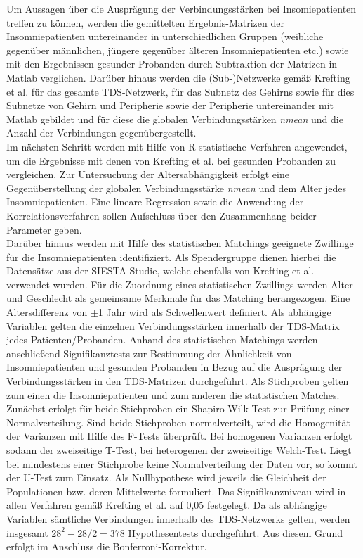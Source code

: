 Um Aussagen über die Ausprägung der Verbindungsstärken bei Insomiepatienten treffen zu können, werden die gemittelten Ergebnis-Matrizen der Insomniepatienten untereinander in unterschiedlichen Gruppen (weibliche gegenüber männlichen, jüngere gegenüber älteren Insomniepatienten etc.) sowie mit den Ergebnissen gesunder Probanden durch Subtraktion der Matrizen in Matlab verglichen. Darüber hinaus werden die (Sub-)Netzwerke gemäß Krefting et al. für das gesamte \acs{TDS}-Netzwerk, für das Subnetz des Gehirns sowie für dies Subnetze von Gehirn und Peripherie sowie der Peripherie untereinander mit Matlab gebildet und für diese die globalen Verbindungsstärken \textit{nmean} und die Anzahl der Verbindungen gegenübergestellt.\\

Im nächsten Schritt werden mit Hilfe von R statistische Verfahren angewendet, um die Ergebnisse mit denen von Krefting et al. bei gesunden Probanden zu vergleichen. Zur Untersuchung der Altersabhängigkeit erfolgt eine Gegenüberstellung der globalen Verbindungsstärke \textit{nmean} und dem Alter jedes Insomniepatienten. Eine lineare Regression sowie die Anwendung der Korrelationsverfahren sollen Aufschluss über den Zusammenhang beider Parameter geben.\\

Darüber hinaus werden mit Hilfe des statistischen Matchings geeignete Zwillinge für die Insomniepatienten identifiziert. Als Spendergruppe dienen hierbei die Datensätze aus der SIESTA-Studie, welche ebenfalls von Krefting et al. verwendet wurden. Für die Zuordnung eines statistischen Zwillings werden Alter und Geschlecht als gemeinsame Merkmale für das Matching herangezogen. Eine Altersdifferenz von $\pm$1 Jahr wird als Schwellenwert definiert. Als abhängige Variablen gelten die einzelnen Verbindungsstärken innerhalb der \acs{TDS}-Matrix jedes Patienten/Probanden. Anhand des statistischen Matchings werden anschließend Signifikanztests zur Bestimmung der Ähnlichkeit von Insomniepatienten und gesunden Probanden in Bezug auf die Ausprägung der Verbindungsstärken in den \acs{TDS}-Matrizen durchgeführt. Als Stichproben gelten zum einen die Insomniepatienten und zum anderen die statistischen Matches. Zunächst erfolgt für beide Stichproben ein Shapiro-Wilk-Test zur Prüfung einer Normalverteilung. Sind beide Stichproben normalverteilt, wird die Homogenität der Varianzen mit Hilfe des F-Tests überprüft. Bei homogenen Varianzen erfolgt sodann der zweiseitige T-Test, bei heterogenen der zweiseitige Welch-Test. Liegt bei mindestens einer Stichprobe keine Normalverteilung der Daten vor, so kommt der U-Test zum Einsatz. Als Nullhypothese wird jeweils die Gleichheit der Populationen bzw. deren Mittelwerte formuliert. Das Signifikanzniveau wird in allen Verfahren gemäß Krefting et al. auf 0,05 festgelegt. Da als abhängige Variablen sämtliche Verbindungen innerhalb des \acs{TDS}-Netzwerks gelten, werden insgesamt $28^2-28/2 = 378$ Hypothesentests durchgeführt. Aus diesem Grund erfolgt im Anschluss die Bonferroni-Korrektur.\\

